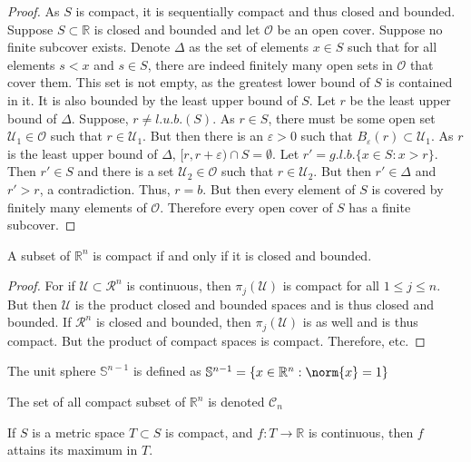 \documentclass[crop=false,class=book,oneside]{standalone}
\begin{document}
            \begin{proof}
            As $S$ is compact, it is sequentially compact and thus closed and bounded. Suppose $S\subset \mathbb{R}$ is closed and bounded and let $\mathcal{O}$ be an open cover. Suppose no finite subcover exists. Denote $\Delta$ as the set of elements $x\in S$ such that for all elements $s<x$ and $s\in S$, there are indeed finitely many open sets in $\mathcal{O}$ that cover them. This set is not empty, as the greatest lower bound of $S$ is contained in it. It is also bounded by the least upper bound of $S$. Let $r$ be the least upper bound of $\Delta$. Suppose, $r\ne l.u.b.(S)$. As $r\in S$, there must be some open set $\mathcal{U}_1\in \mathcal{O}$ such that $r\in \mathcal{U}_1$. But then there is an $\varepsilon>0$ such that $B_{\varepsilon}(r) \subset \mathcal{U}_1$. As $r$ is the least upper bound of $\Delta$, $[r,r+\varepsilon)\cap S = \emptyset$. Let $r' = g.l.b.\{x\in S: x>r\}$. Then $r'\in S$ and there is a set $\mathcal{U}_2 \in \mathcal{O}$ such that $r\in \mathcal{U}_2$. But then $r' \in \Delta$ and $r'>r$, a contradiction. Thus, $r=b$. But then every element of $S$ is covered by finitely many elements of $\mathcal{O}$. Therefore every open cover of $S$ has a finite subcover.
            \end{proof}
            \begin{theorem}
            A subset of $\mathbb{R}^n$ is compact if and only if it is closed and bounded.
            \end{theorem}
            \begin{proof}
            For if $\mathcal{U}\subset \mathcal{R}^n$ is continuous, then $\pi_{j}(\mathcal{U})$ is compact for all $1\leq j \leq n$. But then $\mathcal{U}$ is the product closed and bounded spaces and is thus closed and bounded. If $\mathcal{R}^n$ is closed and bounded, then $\pi_j(\mathcal{U})$ is as well and is thus compact. But the product of compact spaces is compact. Therefore, etc.
            \end{proof}
            \begin{definition}
            The unit sphere $\mathbb{S}^{n-1}$ is defined as $\mathbb{S}^{n-1} = \{x\in \mathbb{R}^n: \norm{x}=1\}$
            \end{definition}
            \begin{notation}
            The set of all compact subset of $\mathbb{R}^n$ is denoted $\mathscr{C}_n$
            \end{notation}
            \begin{theorem}
            If $S$ is a metric space $T\subset S$ is compact, and $f:T\rightarrow \mathbb{R}$ is continuous, then $f$ attains its maximum in $T$.
            \end{theorem}
\end{document}
